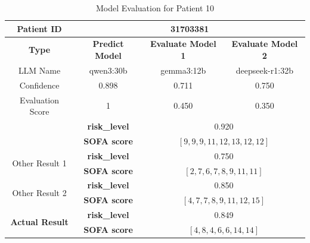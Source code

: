 \begin{table}[htbp]
 \centering
 \caption{Model Evaluation for Patient 10}
 \label{tab:patient10}
 \begin{tabular}{cccc}
 \toprule
 \textbf{ Patient ID } & \multicolumn{3}{c}{31703381} \\
 \midrule
 \textbf{ Type } & \textbf{ Predict Model } & \textbf{ Evaluate Model 1 } & \textbf{ Evaluate Model 2 } \\
 LLM Name & qwen3:30b & gemma3:12b & deepseek-r1:32b \\
 Confidence & 0.898 & 0.711 & 0.750 \\
 Evaluation Score & 1 & 0.450 & 0.350 \\
 \midrule
 \addlinespace
 \multirow{2}{*}{\textbf{ Best Result }} & \textbf{ risk\_level } & \multicolumn{2}{c}{0.920} \\
      & \textbf{ SOFA score } & \multicolumn{2}{c}{$[9, 9, 9, 11, 12, 13, 12, 12]$} \\
 \midrule
 \multirow{2}{*}{Other Result 1} & \textbf{ risk\_level } & \multicolumn{2}{c}{0.750} \\
      & \textbf{ SOFA score } & \multicolumn{2}{c}{$[2, 7, 6, 7, 8, 9, 11, 11]$} \\
 \midrule
 \multirow{2}{*}{Other Result 2} & \textbf{ risk\_level } & \multicolumn{2}{c}{0.850} \\
      & \textbf{ SOFA score } & \multicolumn{2}{c}{$[4, 7, 7, 8, 9, 11, 12, 15]$} \\
 \midrule
 \multirow{2}{*}{\textbf{ Actual Result }} & \textbf{ risk\_level } & \multicolumn{2}{c}{0.849} \\
      & \textbf{ SOFA score } & \multicolumn{2}{c}{$[4, 8, 4, 6, 6, 14, 14]$} \\
 \bottomrule
 \end{tabular}
\end{table}

